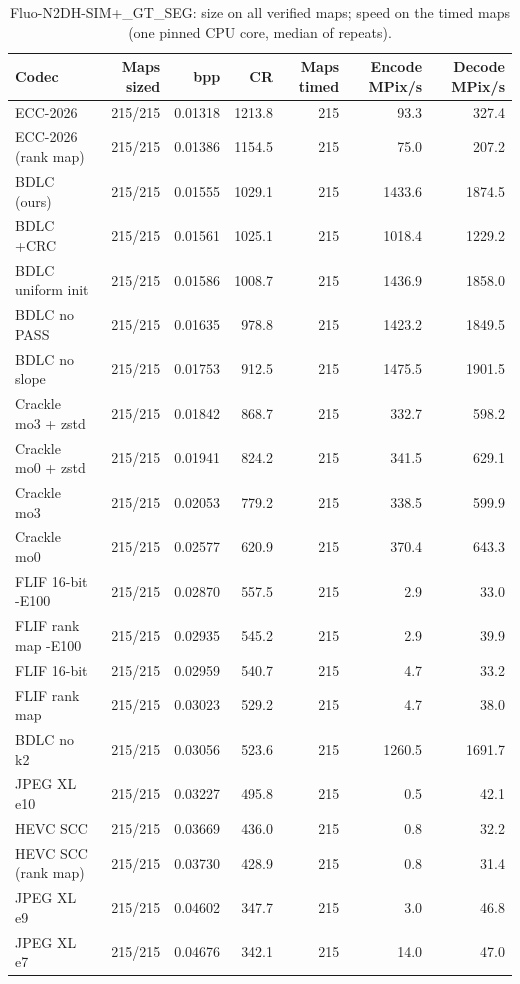 \begin{table}[t]
\centering
\caption{Fluo-N2DH-SIM+\_GT\_SEG: size on all verified maps; speed on the timed maps (one pinned CPU core, median of repeats).}
\begin{tabular}{lrrrrrr}
\hline
Codec & Maps sized & bpp & CR & Maps timed & Encode MPix/s & Decode MPix/s \\
\hline
ECC-2026 & 215/215 & 0.01318 & 1213.8 & 215 & 93.3 & 327.4 \\
ECC-2026 (rank map) & 215/215 & 0.01386 & 1154.5 & 215 & 75.0 & 207.2 \\
BDLC (ours) & 215/215 & 0.01555 & 1029.1 & 215 & 1433.6 & 1874.5 \\
BDLC +CRC & 215/215 & 0.01561 & 1025.1 & 215 & 1018.4 & 1229.2 \\
BDLC uniform init & 215/215 & 0.01586 & 1008.7 & 215 & 1436.9 & 1858.0 \\
BDLC no PASS & 215/215 & 0.01635 & 978.8 & 215 & 1423.2 & 1849.5 \\
BDLC no slope & 215/215 & 0.01753 & 912.5 & 215 & 1475.5 & 1901.5 \\
Crackle mo3 + zstd & 215/215 & 0.01842 & 868.7 & 215 & 332.7 & 598.2 \\
Crackle mo0 + zstd & 215/215 & 0.01941 & 824.2 & 215 & 341.5 & 629.1 \\
Crackle mo3 & 215/215 & 0.02053 & 779.2 & 215 & 338.5 & 599.9 \\
Crackle mo0 & 215/215 & 0.02577 & 620.9 & 215 & 370.4 & 643.3 \\
FLIF 16-bit -E100 & 215/215 & 0.02870 & 557.5 & 215 & 2.9 & 33.0 \\
FLIF rank map -E100 & 215/215 & 0.02935 & 545.2 & 215 & 2.9 & 39.9 \\
FLIF 16-bit & 215/215 & 0.02959 & 540.7 & 215 & 4.7 & 33.2 \\
FLIF rank map & 215/215 & 0.03023 & 529.2 & 215 & 4.7 & 38.0 \\
BDLC no k2 & 215/215 & 0.03056 & 523.6 & 215 & 1260.5 & 1691.7 \\
JPEG XL e10 & 215/215 & 0.03227 & 495.8 & 215 & 0.5 & 42.1 \\
HEVC SCC & 215/215 & 0.03669 & 436.0 & 215 & 0.8 & 32.2 \\
HEVC SCC (rank map) & 215/215 & 0.03730 & 428.9 & 215 & 0.8 & 31.4 \\
JPEG XL e9 & 215/215 & 0.04602 & 347.7 & 215 & 3.0 & 46.8 \\
JPEG XL e7 & 215/215 & 0.04676 & 342.1 & 215 & 14.0 & 47.0 \\

\end{tabular}
\end{table}
